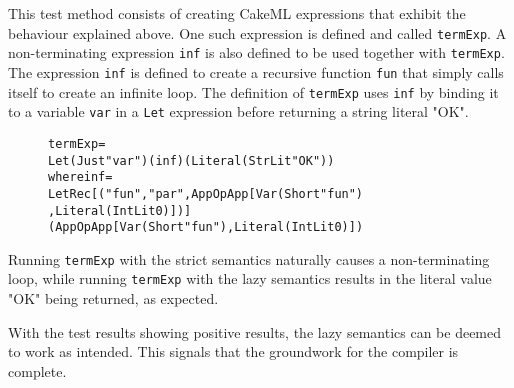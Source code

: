 This test method consists of creating CakeML expressions that exhibit the
behaviour explained above. One such expression is defined
and called \texttt{termExp}. A non-terminating expression \texttt{inf} is also
defined to be used together with \texttt{termExp}.
The expression
\texttt{inf} is defined to create a recursive function \texttt{fun}
that simply calls itself to create an infinite loop.
The definition of \texttt{termExp} uses
\texttt{inf} by binding it to a variable \texttt{var} in a \texttt{Let}
expression before returning a string literal "OK".

\begin{figure}[H]
\begin{alltt}
  termExp =
    Let (Just "var") (inf) (Literal (StrLit "OK"))
    where inf =
      LetRec [("fun", "par", App OpApp [Var (Short "fun")
                                       ,Literal (IntLit 0)])]
      (App OpApp [Var (Short "fun"), Literal (IntLit 0)])
\end{alltt}
\end{figure}

\noindent Running \texttt{termExp} with the strict semantics naturally causes a
non-terminating loop, while running \texttt{termExp} with the lazy semantics
results in the literal value "OK" being returned, as expected.

With the test results showing positive results, the lazy semantics can be deemed
to work as intended. This signals that the groundwork for the compiler is
complete.
